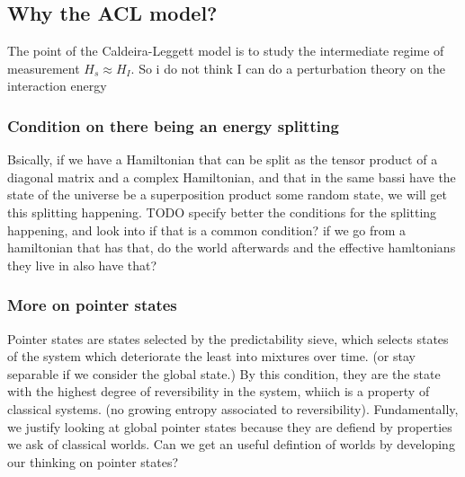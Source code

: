 \documentclass{article}
\begin{document}
\subsection{Why the ACL model?}
The point of the Caldeira-Leggett model is to study the intermediate regime of measurement $H_s\approx H_I$. So i do not think I can do a perturbation theory on the interaction energy

\subsubsection{Condition on there being an energy splitting}

Bsically, if we have a Hamiltonian that can be split as the tensor product of a diagonal matrix and a complex Hamiltonian, and that in the same bassi have the state of the universe be a superposition product some random state, we will get this splitting happening. TODO specify better the conditions for the splitting happening, and look into if that is a common condition? if we go from a hamiltonian that has that, do the world afterwards and the effective hamltonians they live in also have that?

\subsubsection{More on pointer states}

Pointer states are states selected by the predictability sieve, which selects states of the system which deteriorate the least into mixtures over time. (or stay separable if we consider the global state.) By this condition, they are the state with the highest degree of reversibility in the system, whiich is a property of classical systems. (no growing entropy associated to reversibility). Fundamentally, we justify looking at global pointer states because they are defiend by properties we ask of classical worlds. Can we get an useful defintion of worlds by developing our thinking on pointer states? \\
\end{document}
